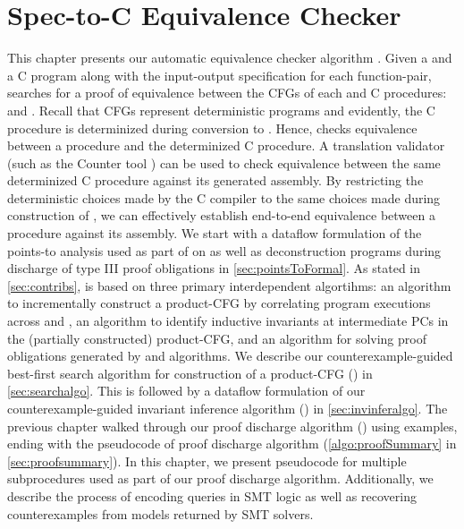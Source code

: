 \chapter{Spec-to-C Equivalence Checker}
\label{sec:spectocalgo}
This chapter presents our automatic equivalence checker algorithm \toolName{}.
Given a \SpecL{} and a C program along with the input-output specification for each function-pair,
\toolName{} searches for a proof of equivalence between the CFGs of each \SpecL{} and C procedures: \sprog{} and \cprog{}.
Recall that CFGs represent deterministic programs and evidently, the C procedure is determinized during conversion to \cprog{}.
Hence, \toolName{} checks equivalence between a \SpecL{} procedure and the determinized C procedure.
A translation validator (such as the Counter tool \cite{oopsla20}) can be used to check equivalence between
the same determinized C procedure against its generated assembly.
By restricting the deterministic choices made by the C compiler to the same choices made during construction of \cprog{},
we can effectively establish end-to-end equivalence between a \SpecL{} procedure against its assembly.
We start with a dataflow formulation of the points-to analysis used as part of \toolName{} on \cprog{} as well as
deconstruction programs during discharge of type III proof obligations in \cref{sec:pointsToFormal}.
As stated in \cref{sec:contribs}, \toolName{} is based on three primary interdependent algortihms:
 an algorithm to incrementally construct a product-CFG by correlating program executions across
\sprog{} and \cprog{},
 an algorithm to identify inductive invariants at intermediate PCs in the (partially constructed)
product-CFG, and
 an algorithm for solving proof obligations generated by  and  algorithms.
We describe our counterexample-guided best-first search algorithm for construction of a product-CFG () in \cref{sec:searchalgo}.
This is followed by a dataflow formulation of our counterexample-guided invariant inference algorithm () in \cref{sec:invinferalgo}.
The previous chapter walked through our proof discharge algorithm () using examples, ending with
the pseudocode of proof discharge algorithm (\cref{algo:proofSummary} in \cref{sec:proofsummary}).
In this chapter, we present pseudocode for multiple subprocedures used as part of our proof discharge algorithm.
Additionally, we describe the process of encoding queries in SMT logic as well as recovering counterexamples from models returned by SMT solvers.

